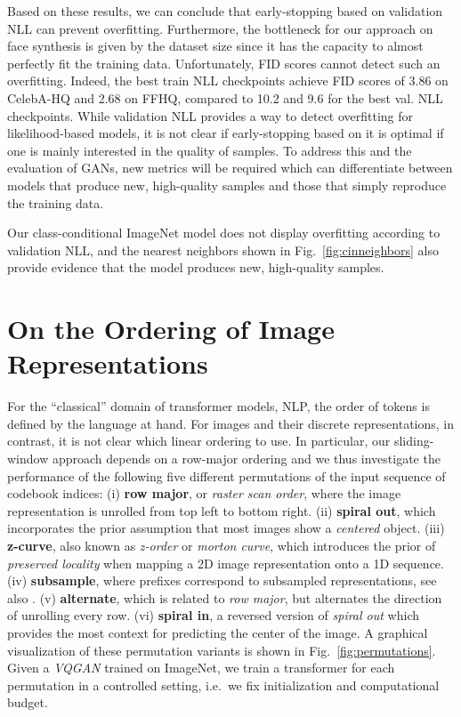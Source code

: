 \documentclass[final]{cvpr}
\begin{document}
Based on these results, we can conclude that early-stopping based on validation
NLL can prevent overfitting. Furthermore, the bottleneck for our approach on
face synthesis is given by the dataset size since it has the capacity to almost
perfectly fit the training data. Unfortunately, FID scores cannot detect such
an overfitting. Indeed, the best train NLL checkpoints achieve FID scores of
3.86 on CelebA-HQ and 2.68 on FFHQ, compared to 10.2 and 9.6 for the best val.
NLL checkpoints. While validation NLL provides a way to detect overfitting for
likelihood-based models, it is not clear if early-stopping based on it is
optimal if one is mainly interested in the quality of samples. To address this
and the evaluation of GANs, new metrics will be required which can
differentiate between models that produce new, high-quality samples and those
that simply reproduce the training data.

Our class-conditional ImageNet model does not display overfitting according to
validation NLL, and the nearest neighbors shown in Fig.~\ref{fig:cinneighbors}
also provide evidence that the model produces new, high-quality samples.

\facesnns
\cinneighbors

\section{On the Ordering of Image Representations}
\label{sec:orderingsupp}

%
%
\noindent For the ``classical'' domain of transformer models, NLP, the order
of tokens is defined by the language at hand. For images and their discrete
representations, in contrast, it is not clear which linear ordering to use.
In particular, our sliding-window approach depends on a row-major ordering and
we thus investigate the performance of the following five different
permutations of the input sequence of codebook indices: (i) \textbf{row
major}, or \emph{raster scan order}, where the image representation
%
is unrolled from top left to bottom right.
(ii) \textbf{spiral out}, which incorporates the prior assumption that most images show a
\emph{centered} object.
(iii) \textbf{z-curve}, also known as \emph{z-order} or
\emph{morton curve}, which introduces the
prior of \emph{preserved locality} when mapping a 2D image
representation onto a 1D sequence.
(iv) \textbf{subsample}, where prefixes correspond to subsampled
representations, see also \cite{MenickK19}.
%
%
(v) \textbf{alternate}, which is related to \emph{row major}, but alternates the
direction of unrolling every row.
(vi) \textbf{spiral in}, a reversed version of \emph{spiral out} which provides
the most context for predicting the center of the image.
A graphical visualization of these permutation variants is shown in Fig.~\ref{fig:permutations}. Given a \emph{VQGAN} trained on ImageNet, we train a transformer for each permutation in a controlled setting, i.e.\
we fix initialization and computational budget.
\end{document}
